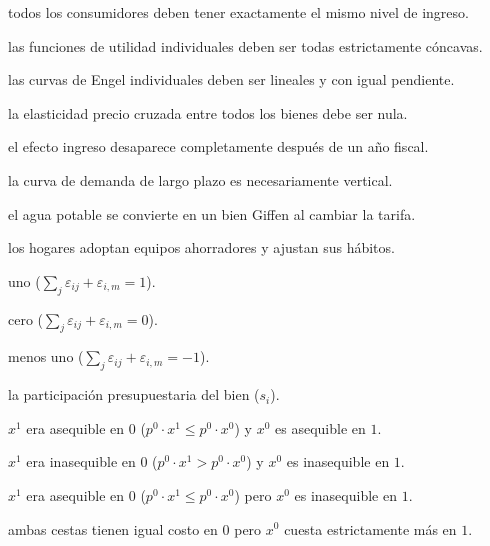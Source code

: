 \begin{opts}
    \item todos los consumidores deben tener exactamente el mismo nivel de ingreso.
    \item las funciones de utilidad individuales deben ser todas estrictamente cóncavas.
    \item las curvas de Engel individuales deben ser lineales y con igual pendiente.
    \item la elasticidad precio cruzada entre todos los bienes debe ser nula.
\end{opts}

\begin{opts}
    \item el efecto ingreso desaparece completamente después de un año fiscal.
    \item la curva de demanda de largo plazo es necesariamente vertical.
    \item el agua potable se convierte en un bien Giffen al cambiar la tarifa.
    \item los hogares adoptan equipos ahorradores y ajustan sus hábitos.
\end{opts}

\begin{opts}
    \item uno ($\sum_j \varepsilon_{ij} + \varepsilon_{i,m} = 1$).
    \item cero ($\sum_j \varepsilon_{ij} + \varepsilon_{i,m} = 0$).
    \item menos uno ($\sum_j \varepsilon_{ij} + \varepsilon_{i,m} = -1$).
    \item la participación presupuestaria del bien ($s_i$).
\end{opts}

\begin{opts}
    \item $x^1$ era asequible en $0$ ($p^0 \cdot x^1 \le p^0 \cdot x^0$) y $x^0$ es asequible en $1$.
    \item $x^1$ era inasequible en $0$ ($p^0 \cdot x^1 > p^0 \cdot x^0$) y $x^0$ es inasequible en $1$.
    \item $x^1$ era asequible en $0$ ($p^0 \cdot x^1 \le p^0 \cdot x^0$) pero $x^0$ es inasequible en $1$.
    \item ambas cestas tienen igual costo en $0$ pero $x^0$ cuesta estrictamente más en $1$.
\end{opts}

